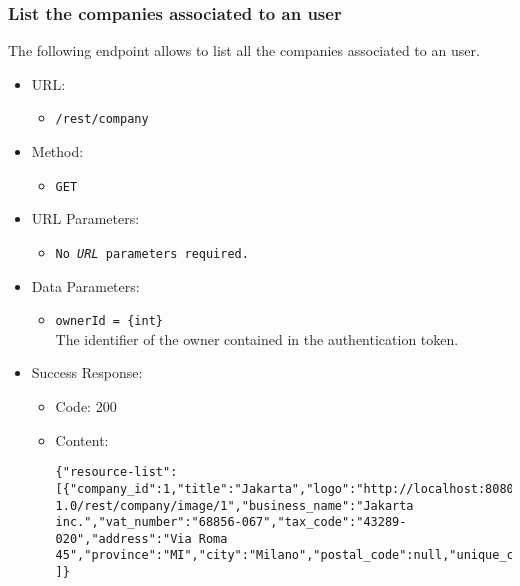 \newpage
\subsubsection*{List the companies associated to an user}

The following endpoint allows to list all the companies associated to an user.

\begin{itemize}

    \item URL:
    \begin{itemize}
        \item \texttt{/rest/company}
    \end{itemize}

    \item Method:
    \begin{itemize}
        \item \texttt{GET}
    \end{itemize}

    \item URL Parameters:
    \begin{itemize}
        \item \texttt{No \textit{URL} parameters required.}
    \end{itemize}

    \item Data Parameters:
    \begin{itemize}
        \item \texttt{ownerId = \{int\}} \\
        The identifier of the owner contained in the authentication token.
    \end{itemize}

    \item Success Response:
    \begin{itemize}
        \item Code: 200
        \item Content:
        \begin{lstlisting}
{"resource-list":
[{"company_id":1,"title":"Jakarta","logo":"http://localhost:8080/bitsei-1.0/rest/company/image/1","business_name":"Jakarta inc.","vat_number":"68856-067","tax_code":"43289-020","address":"Via Roma 45","province":"MI","city":"Milano","postal_code":null,"unique_code":"1","has_mail_notifications":false,"has_telegram_notifications":false}
]}
        \end{lstlisting}
    \end{itemize}


\end{itemize}
